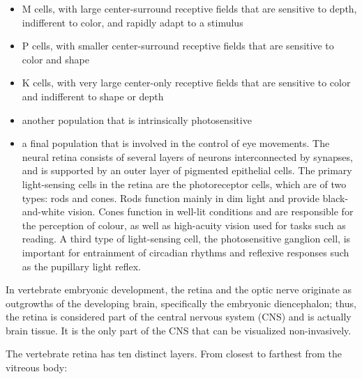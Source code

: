 \begin{itemize}
\tightlist
\item
  M cells, with large center-surround receptive fields that are sensitive to depth, indifferent to color, and rapidly adapt to a stimulus
\item
  P cells, with smaller center-surround receptive fields that are sensitive to color and shape
\item
  K cells, with very large center-only receptive fields that are sensitive to color and indifferent to shape or depth
\item
  another population that is intrinsically photosensitive
\item
  a final population that is involved in the control of eye movements.
  The neural retina consists of several layers of neurons interconnected by synapses, and is supported by an outer layer of pigmented epithelial cells. The primary light-sensing cells in the retina are the photoreceptor cells, which are of two types: rods and cones. Rods function mainly in dim light and provide black-and-white vision. Cones function in well-lit conditions and are responsible for the perception of colour, as well as high-acuity vision used for tasks such as reading. A third type of light-sensing cell, the photosensitive ganglion cell, is important for entrainment of circadian rhythms and reflexive responses such as the pupillary light reflex.
\end{itemize}

In vertebrate embryonic development, the retina and the optic nerve originate as outgrowths of the developing brain, specifically the embryonic diencephalon; thus, the retina is considered part of the central nervous system (CNS) and is actually brain tissue. It is the only part of the CNS that can be visualized non-invasively.

The vertebrate retina has ten distinct layers. From closest to farthest from the vitreous body:

